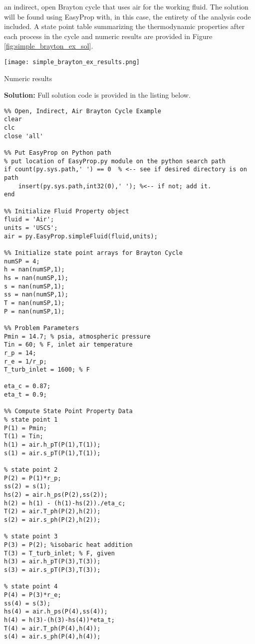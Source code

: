  an indirect, open Brayton cycle that uses air for the working fluid.  The solution will be found using EasyProp with, in this case, the entirety of the analysis code included.  A state point table summarizing the thermodynamic properties after each process in the cycle  and numeric results are provided in Figure \ref{fig:simple_brayton_ex_sol}.

\begin{marginfigure}
\texttt{[image: simple\_brayton\_ex\_results.png]}
\caption{Numeric results}
\label{fig:simple_brayton_ex_sol}
\end{marginfigure}

\textbf{Solution:}
Full solution code is provided in the listing below.
\begin{lstlisting}
%% Open, Indirect, Air Brayton Cycle Example
clear
clc
close 'all'

%% Put EasyProp on Python path
% put location of EasyProp.py module on the python search path
if count(py.sys.path,' ') == 0  % <-- see if desired directory is on path
    insert(py.sys.path,int32(0),' '); %<-- if not; add it.
end

%% Initialize Fluid Property object
fluid = 'Air';
units = 'USCS';
air = py.EasyProp.simpleFluid(fluid,units);

%% Initialize state point arrays for Brayton Cycle
numSP = 4;
h = nan(numSP,1);
hs = nan(numSP,1);
s = nan(numSP,1);
ss = nan(numSP,1);
T = nan(numSP,1);
P = nan(numSP,1);

%% Problem Parameters
Pmin = 14.7; % psia, atmospheric pressure
Tin = 60; % F, inlet air temperature
r_p = 14;
r_e = 1/r_p;
T_turb_inlet = 1600; % F

eta_c = 0.87;
eta_t = 0.9;

%% Compute State Point Property Data
% state point 1
P(1) = Pmin;
T(1) = Tin;
h(1) = air.h_pT(P(1),T(1));
s(1) = air.s_pT(P(1),T(1));

% state point 2
P(2) = P(1)*r_p;
ss(2) = s(1);
hs(2) = air.h_ps(P(2),ss(2));
h(2) = h(1) - (h(1)-hs(2))./eta_c;
T(2) = air.T_ph(P(2),h(2));
s(2) = air.s_ph(P(2),h(2));

% state point 3
P(3) = P(2); %isobaric heat addition
T(3) = T_turb_inlet; % F, given
h(3) = air.h_pT(P(3),T(3));
s(3) = air.s_pT(P(3),T(3));

% state point 4
P(4) = P(3)*r_e;
ss(4) = s(3); 
hs(4) = air.h_ps(P(4),ss(4));
h(4) = h(3)-(h(3)-hs(4))*eta_t;
T(4) = air.T_ph(P(4),h(4));
s(4) = air.s_ph(P(4),h(4));


\end{lstlisting}
